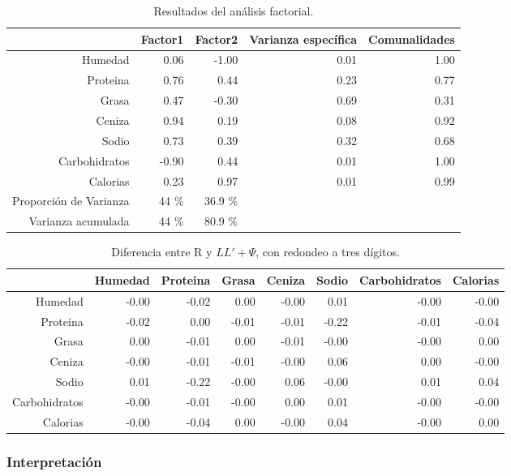 \begin{table}[ht]
\centering
\begin{tabular}{rrrrr}
  \hline
 & Factor1 & Factor2 & Varianza específica & Comunalidades \\ 
  \hline
Humedad & 0.06 & -1.00 & 0.01 & 1.00 \\ 
  Proteina & 0.76 & 0.44 & 0.23 & 0.77 \\ 
  Grasa & 0.47 & -0.30 & 0.69 & 0.31 \\ 
  Ceniza & 0.94 & 0.19 & 0.08 & 0.92 \\ 
  Sodio & 0.73 & 0.39 & 0.32 & 0.68 \\ 
  Carbohidratos & -0.90 & 0.44 & 0.01 & 1.00 \\ 
  Calorias & 0.23 & 0.97 & 0.01 & 0.99 \\     
  Proporción de Varianza  & 44 \% &  36.9 \% \\
  Varianza acumulada & 44 \% &  80.9 \% \\ 
   \hline
\end{tabular}
	\label{tabla:factores}
	\caption{Resultados del análisis factorial.}
\end{table}


\begin{table}[ht]
\centering
\begin{tabular}{rrrrrrrr}
  \hline
 & Humedad & Proteina & Grasa & Ceniza & Sodio & Carbohidratos & Calorias \\ 
  \hline
Humedad & -0.00 & -0.02 & 0.00 & -0.00 & 0.01 & -0.00 & -0.00 \\ 
  Proteina & -0.02 & 0.00 & -0.01 & -0.01 & -0.22 & -0.01 & -0.04 \\ 
  Grasa & 0.00 & -0.01 & 0.00 & -0.01 & -0.00 & -0.00 & 0.00 \\ 
  Ceniza & -0.00 & -0.01 & -0.01 & -0.00 & 0.06 & 0.00 & -0.00 \\ 
  Sodio & 0.01 & -0.22 & -0.00 & 0.06 & -0.00 & 0.01 & 0.04 \\ 
  Carbohidratos & -0.00 & -0.01 & -0.00 & 0.00 & 0.01 & -0.00 & -0.00 \\ 
  Calorias & -0.00 & -0.04 & 0.00 & -0.00 & 0.04 & -0.00 & 0.00 \\ 
   \hline
\end{tabular}
	\label{tabla:aproximacion}
	\caption{Diferencia entre R y $LL' + \Psi$, con redondeo a tres dígitos.}
\end{table}

\subsubsection{Interpretación}

